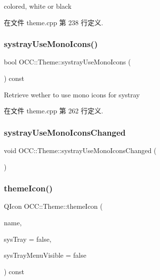 colored, white or black 

在文件 theme.\+cpp 第 238 行定义.

\mbox{\label{class_o_c_c_1_1_theme_ad78da2daf0f820d80720fa977a91448e}} 
\subsubsection{\texorpdfstring{systray\+Use\+Mono\+Icons()}{systrayUseMonoIcons()}}
{\footnotesize\ttfamily bool O\+C\+C\+::\+Theme\+::systray\+Use\+Mono\+Icons (\begin{DoxyParamCaption}{ }\end{DoxyParamCaption}) const}

Retrieve wether to use mono icons for systray 

在文件 theme.\+cpp 第 262 行定义.

\mbox{\label{class_o_c_c_1_1_theme_a58f89be5e4c25fdaaa828800c2549a61}} 
\subsubsection{\texorpdfstring{systray\+Use\+Mono\+Icons\+Changed}{systrayUseMonoIconsChanged}}
{\footnotesize\ttfamily void O\+C\+C\+::\+Theme\+::systray\+Use\+Mono\+Icons\+Changed (\begin{DoxyParamCaption}\item[{bool}]{ }\end{DoxyParamCaption})\hspace{0.3cm}{\ttfamily [signal]}}

\mbox{\label{class_o_c_c_1_1_theme_a5ccbdaad81bd46b9abb284a82832a93e}} 
\subsubsection{\texorpdfstring{theme\+Icon()}{themeIcon()}}
{\footnotesize\ttfamily Q\+Icon O\+C\+C\+::\+Theme\+::theme\+Icon (\begin{DoxyParamCaption}\item[{const Q\+String \&}]{name,  }\item[{bool}]{sys\+Tray = {\ttfamily false},  }\item[{bool}]{sys\+Tray\+Menu\+Visible = {\ttfamily false} }\end{DoxyParamCaption}) const\hspace{0.3cm}{\ttfamily [protected]}}



